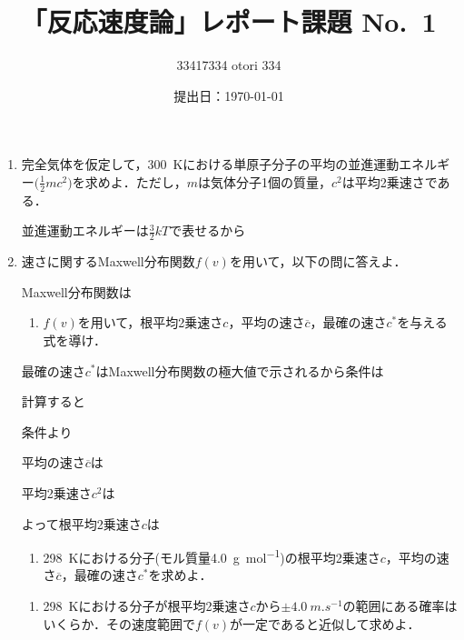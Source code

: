 \documentclass[uplatex,dvipdfmx,a4paper,10pt]{jsarticle}
\title{ 「反応速度論」レポート課題 No.~1}
\author{33417334 otori 334}
\date{提出日：\today}
\def\tightlist{\itemsep1pt\parskip0pt\parsep0pt}
\begin{document}
\maketitle

\begin{abstract}\end{abstract}
	


\thispagestyle{empty}



%
\begin{enumerate}
\def\labelenumi{\arabic{enumi}.}
\item
  完全気体を仮定して，\SI{300}{\kelvin}における単原子分子の平均の並進運動エネルギー\(\bigl(\frac{1}{2}mc^2\bigr)\)を求めよ．ただし，\(m\)は気体分子1個の質量，\(c^2\)は平均2乗速さである．

  並進運動エネルギーは\(\frac{3}{2}kT\)で表せるから 
\item
  速さに関するMaxwell分布関数\(f(v)\)を用いて，以下の問に答えよ．

  Maxwell分布関数は 

  \begin{enumerate}
  \def\labelenumii{\arabic{enumii}.}
  \tightlist
  \item
    \(f(v)\)を用いて，根平均2乗速さ\(c\)，平均の速さ\(\overline{c}\)，最確の速さ\(c^{\ast}\)を与える式を導け．
  \end{enumerate}

  最確の速さ\(c^{\ast}\)はMaxwell分布関数の極大値で示されるから条件は
  

  計算すると 

  条件より 

  平均の速さ\(\overline{c}\)は 

  平均2乗速さ\(c^2\)は

  

  よって根平均2乗速さ\(c\)は 

  \begin{enumerate}
  \def\labelenumii{\arabic{enumii}.}
  \setcounter{enumii}{1}
  \tightlist
  \item
    \SI{298}{\kelvin}における分子(モル質量\SI{4.0}{g.mol^{-1}})の根平均2乗速さ\(c\)，平均の速さ\(\overline{c}\)，最確の速さ\(c^{\ast}\)を求めよ．
  \end{enumerate}

  

  \begin{enumerate}
  \def\labelenumii{\arabic{enumii}.}
  \setcounter{enumii}{2}
  \tightlist
  \item
    \SI{298}{\kelvin}における分子が根平均2乗速さ\(c\)から\(\pm\SI{4.0}{m.s^{-1}}\)の範囲にある確率はいくらか．その速度範囲で\(f(v)\)が一定であると近似して求めよ．
  \end{enumerate}

  
\end{enumerate}
\end{document}
